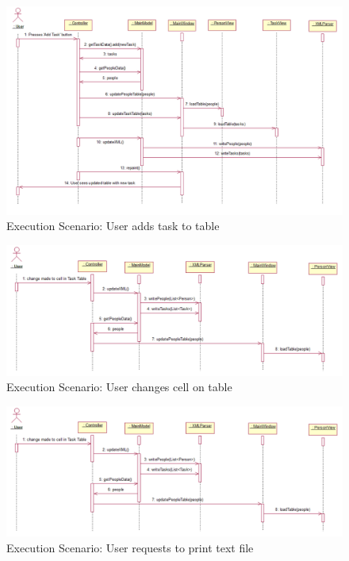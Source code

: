 \documentclass[12pt]{article}
\begin{document}
\begin{figure}[htbp]
\begin{center} \includegraphics[scale=.55]{Diagrams/add_task_diagram.png} \end{center}
\caption{Execution Scenario: User adds task to table}
\label{fig:add-task-diagram}
\end{figure}

\begin{figure}[htbp]
\begin{center} \includegraphics[scale=.55]{Diagrams/change_cell_diagram.png} \end{center}
\caption{Execution Scenario: User changes cell on table}
\label{fig:change-cell-diagram}
\end{figure}

\begin{figure}[htbp]
\begin{center} \includegraphics[scale=.55]{Diagrams/change_cell_diagram.png} \end{center}
\caption{Execution Scenario: User requests to print text file}
\label{fig:print-text-diagram}
\end{figure}
\end{document}
